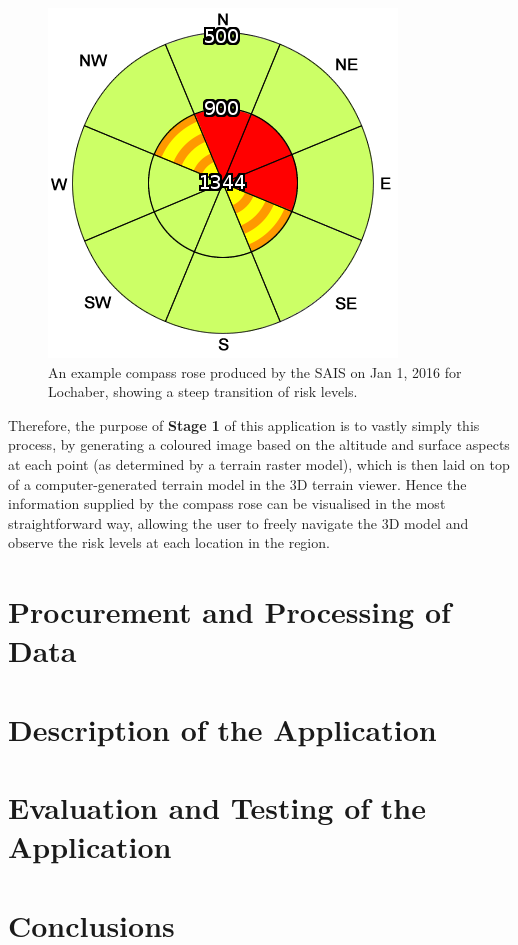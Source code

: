 \documentclass[openany]{UoYCSproject}
\begin{document}
\begin{figure}[h]
		\centering
		\includegraphics[scale=0.5]{RealDangerousRose.png}
		\caption{\label{fig:realrose} An example compass rose produced by the SAIS on Jan 1, 2016 for Lochaber, showing a steep transition of risk levels. \cite{sais-lochaber0106}}
\end{figure}

Therefore, the purpose of \textbf{Stage 1} of this application is to vastly simply this process, by generating a coloured image based on the altitude and surface aspects at each point (as determined by a terrain raster model), which is then laid on top of a computer-generated terrain model in the 3D terrain viewer. Hence the information supplied by the compass rose can be visualised in the most straightforward way, allowing the user to freely navigate the 3D model and observe the risk levels at each location in the region. 

\chapter{Procurement and Processing of Data} \label{ch:data}

\chapter{Description of the Application} \label{ch:app-description}

\chapter{Evaluation and Testing of the Application} \label{ch:app-testing}

\chapter{Conclusions} \label{ch:conclusions}

\small{}
\end{document}
